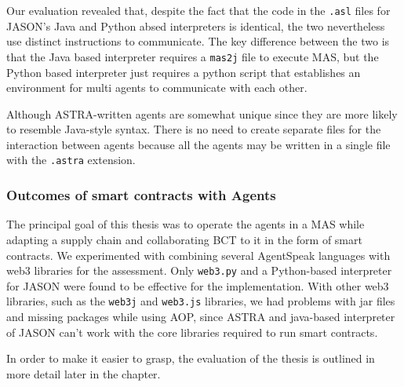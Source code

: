   \vspace{.5cm}
  
  Our evaluation revealed that, despite the fact that the code in the \texttt{.asl} files for JASON's Java and Python absed interpreters is identical, the two nevertheless use distinct instructions to communicate. The key difference between the two is that the Java based interpreter requires a \texttt{mas2j} file to execute \ac{MAS}, but the Python based interpreter just requires a python script that establishes an environment for multi agents to communicate with each other.

  \vspace{.5cm}

  Although \ac{ASTRA}-written agents are somewhat unique since they are more likely to resemble Java-style syntax. There is no need to create separate files for the interaction between agents because all the agents may be written in a single file with the \texttt{.astra} extension.

\subsubsection{Outcomes of smart contracts with Agents}

The principal goal of this thesis was to operate the agents in a \ac{MAS} while adapting a supply chain and collaborating \ac{BCT} to it in the form of smart contracts. We experimented with combining several AgentSpeak languages with web3 libraries for the assessment. Only \texttt{web3.py} and a Python-based interpreter for JASON were found to be effective for the implementation. With other web3 libraries, such as the \texttt{web3j} and \texttt{web3.js} libraries, we had problems with jar files and missing packages while using \ac{AOP}, since \ac{ASTRA} and java-based interpreter of JASON can't work with the core libraries required to run smart contracts.

 \vspace{.5cm}
 
In order to make it easier to grasp, the evaluation of the thesis is outlined in more detail later in the chapter.

